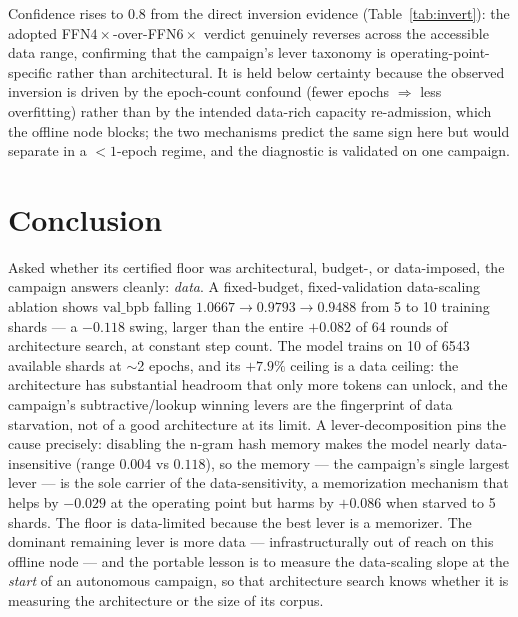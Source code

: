\documentclass{article}
\newcommand{\valbpb}{\mathrm{val\_bpb}}
\begin{document}
Confidence rises to $0.8$ from the direct inversion evidence (Table~\ref{tab:invert}): the adopted FFN$4\times$-over-FFN$6\times$ verdict genuinely reverses across the accessible data range, confirming that the campaign's lever taxonomy is operating-point-specific rather than architectural. It is held below certainty because the observed inversion is driven by the epoch-count confound (fewer epochs $\Rightarrow$ less overfitting) rather than by the intended data-rich capacity re-admission, which the offline node blocks; the two mechanisms predict the same sign here but would separate in a $<1$-epoch regime, and the diagnostic is validated on one campaign.

\section{Conclusion}
\label{sec:conclusion}

Asked whether its certified floor was architectural, budget-, or data-imposed, the campaign answers cleanly: \emph{data}. A fixed-budget, fixed-validation data-scaling ablation shows $\valbpb$ falling $1.0667\to0.9793\to0.9488$ from 5 to 10 training shards --- a $-0.118$ swing, larger than the entire $+0.082$ of 64 rounds of architecture search, at constant step count. The model trains on 10 of 6543 available shards at $\sim$2 epochs, and its $+7.9\%$ ceiling is a data ceiling: the architecture has substantial headroom that only more tokens can unlock, and the campaign's subtractive/lookup winning levers are the fingerprint of data starvation, not of a good architecture at its limit. A lever-decomposition pins the cause precisely: disabling the n-gram hash memory makes the model nearly data-insensitive (range $0.004$ vs $0.118$), so the memory --- the campaign's single largest lever --- is the sole carrier of the data-sensitivity, a memorization mechanism that helps by $-0.029$ at the operating point but harms by $+0.086$ when starved to 5 shards. The floor is data-limited because the best lever is a memorizer. The dominant remaining lever is more data --- infrastructurally out of reach on this offline node --- and the portable lesson is to measure the data-scaling slope at the \emph{start} of an autonomous campaign, so that architecture search knows whether it is measuring the architecture or the size of its corpus.


\end{document}
